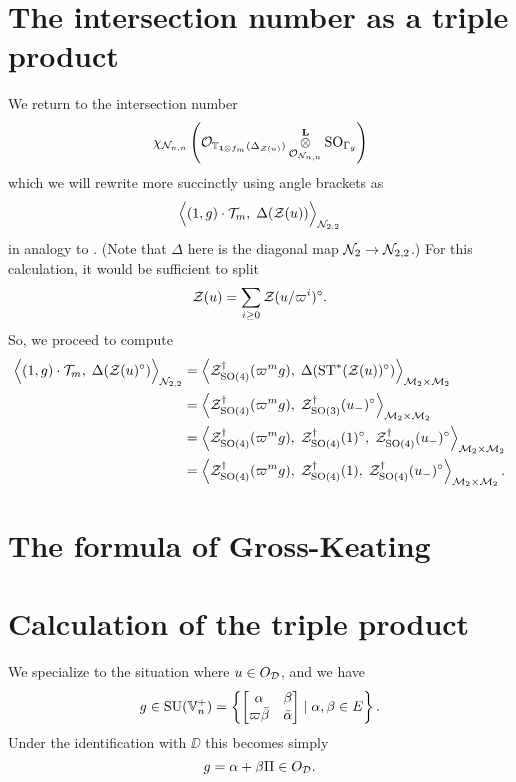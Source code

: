 \section{The intersection number as a triple product}
We return to the intersection number
\[ \chi_{\mathcal N_{n,n}} \left(
      \mathcal{O}_{\mathbb T_{\mathbf{1} \otimes f_m}(\Delta_{\mathcal Z(u)})}
      \mathop{\otimes}^{\mathbf{L}}_{\mathcal{O}_{\mathcal N_{n,n}}} \operatorname{SO}_{\Gamma_g} \right) \]
which we will rewrite more succinctly using angle brackets as
\[ \Big\langle (1,g) \cdot \mathcal{T}_m, \; \Delta(\mathcal Z(u)) \Big\rangle_{\mathcal N_{2,2}} \]
in analogy to \cite[\S6.1]{ref:AFLspherical}.
(Note that $\Delta$ here is the diagonal map $\mathcal N_2 \to \mathcal N_{2,2}$.)
For this calculation, it would be sufficient to split
\[ \mathcal Z(u) = \sum_{i \ge 0} \mathcal Z(u/\varpi^i)^\circ. \]
So, we proceed to compute
\begin{align*}
  \Big\langle (1,g) \cdot \mathcal{T}_m, \; \Delta(\mathcal Z(u)^\circ) \Big\rangle_{\mathcal N_{2,2}}
  &= \left< \mathcal Z^{\dagger}_{\operatorname{SO}(4)}(\varpi^m g), \; \Delta(\operatorname{ST}^\ast(\mathcal Z(u))^\circ) \right>_{\mathcal M_2 \times \mathcal M_2} \\
  &= \left< \mathcal Z^{\dagger}_{\operatorname{SO}(4)}(\varpi^m g), \; \mathcal Z^{\dagger}_{\operatorname{SO}(3)}(u_-)^\circ \right>_{\mathcal M_2 \times \mathcal M_2} \\
  &= \left< \mathcal Z^{\dagger}_{\operatorname{SO}(4)}(\varpi^m g), \; \mathcal Z^{\dagger}_{\operatorname{SO}(4)}(1)^\circ, \; \mathcal Z^{\dagger}_{\operatorname{SO}(4)}(u_-)^\circ \right>_{\mathcal M_2 \times \mathcal M_2} \\
  &= \left< \mathcal Z^{\dagger}_{\operatorname{SO}(4)}(\varpi^m g), \; \mathcal Z^{\dagger}_{\operatorname{SO}(4)}(1), \; \mathcal Z^{\dagger}_{\operatorname{SO}(4)}(u_-)^\circ \right>_{\mathcal M_2 \times \mathcal M_2}.
\end{align*}

\section{The formula of Gross-Keating}
\begin{theorem}
\end{theorem}

\section{Calculation of the triple product}
We specialize to the situation where $u \in O_\mathcal D$,
and we have
\[ g \in \operatorname{SU}(\mathbb V_n^+) = \left\{
    \begin{bmatrix} \alpha & \beta \\ \varpi\bar\beta & \bar\alpha \end{bmatrix}
    \mid \alpha, \beta \in E
  \right\}.
\]
Under the identification with $\DD$ this becomes simply
\[ g = \alpha + \beta \Pi \in O_\mathcal D. \]
